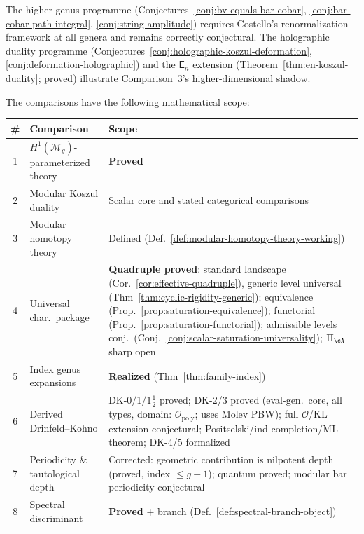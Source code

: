 The higher-genus programme
(Conjectures~\ref{conj:bv-equals-bar-cobar},
\ref{conj:bar-cobar-path-integral},
\ref{conj:string-amplitude}) requires Costello's
renormalization framework at all genera and remains correctly
conjectural.  The holographic duality programme
(Conjectures~\ref{conj:holographic-koszul-deformation},
\ref{conj:deformation-holographic}) and the $\mathsf{E}_n$
extension (Theorem~\ref{thm:en-koszul-duality}; proved) illustrate
Comparison~3's higher-dimensional shadow.

\medskip

\begin{remark}\label{rem:nine-futures-summary}
The comparisons have the following mathematical scope:
\begin{center}
\renewcommand{\arraystretch}{1.2}
\begin{tabular}{@{}clp{5.5cm}@{}}
\toprule
\textbf{\#} & \textbf{Comparison} & \textbf{Scope} \\
\midrule
1 & $H^1(\mathcal{M}_g)$-parameterized theory & \textbf{Proved} \\
2 & Modular Koszul duality & Scalar core and stated categorical comparisons \\
3 & Modular homotopy theory & Defined (Def.~\ref{def:modular-homotopy-theory-working}) \\
4 & Universal char.\ package & \textbf{Quadruple proved}: standard landscape (Cor.~\ref{cor:effective-quadruple}), generic level universal (Thm~\ref{thm:cyclic-rigidity-generic}); equivalence (Prop.~\ref{prop:saturation-equivalence}); functorial (Prop.~\ref{prop:saturation-functorial}); admissible levels conj.\ (Conj.~\ref{conj:scalar-saturation-universality}); $\Pi_{\cA}$ sharp open \\
5 & Index genus expansions & \textbf{Realized} (Thm~\ref{thm:family-index}) \\
6 & Derived Drinfeld--Kohno & DK-0/1/$1\frac{1}{2}$ proved; DK-2/3 proved (eval-gen.\ core, all types, domain: $\mathcal{O}_{\mathrm{poly}}$; uses Molev PBW); full $\mathcal{O}$/KL extension conjectural; Positselski/ind-completion/ML theorem; DK-4/5 formalized \\
7 & Periodicity \& tautological depth & Corrected: geometric contribution is nilpotent depth (proved, index $\leq g-1$); quantum proved; modular bar periodicity conjectural \\
8 & Spectral discriminant & \textbf{Proved} + branch (Def.~\ref{def:spectral-branch-object}) \\

\end{tabular}
\end{center}
\end{remark}

